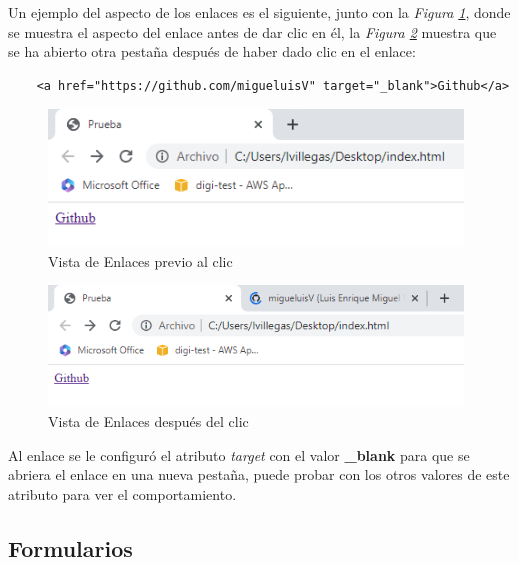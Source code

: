 Un ejemplo del aspecto de los enlaces es el siguiente, junto con la \textit{Figura \ref{fig: 6}}, donde se muestra el aspecto del enlace antes de dar clic en él, la \textit{Figura \ref{fig: 7}} muestra que se ha abierto otra pestaña después de haber dado clic en el enlace:
\begin{lstlisting}
    <a href="https://github.com/migueluisV" target="_blank">Github</a>
\end{lstlisting}
\begin{figure}[H]
    \centering
    \caption{Vista de Enlaces previo al clic}
    \label{fig: 6}
    \includegraphics[width=11cm]{ss_html/enlaces_1.png}
\end{figure}
\begin{figure}[H]
    \centering
    \caption{Vista de Enlaces después del clic}
    \label{fig: 7}
    \includegraphics[width=11cm]{ss_html/enlaces_2.png}
\end{figure}

Al enlace se le configuró el atributo \textit{target} con el valor \textbf{\_blank} para que se abriera el enlace en una nueva pestaña, puede probar con los otros valores de este atributo para ver el comportamiento.


\subsection{Formularios}

